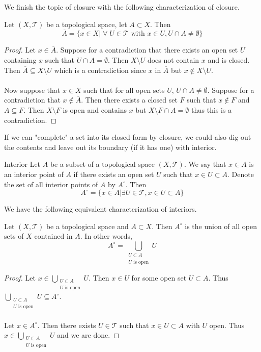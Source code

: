 \documentclass[a4paper]{article}
\begin{document}
We finish the topic of closure with the following characterization of closure. 

\begin{thm}{}{} Let $(X,\mathcal{T})$ be a topological space, let $A\subset X$. Then $$\overline{A}=\{x\in X|\;\forall\;U\in\mathcal{T}\text{ with }x\in U,U\cap A\neq\emptyset\}$$ \tcbline
\begin{proof}
Let $x\in\overline{A}$. Suppose for a contradiction that there exists an open set $U$ containing $x$ such that $U\cap A=\emptyset$. Then $X\setminus U$ does not contain $x$ and is closed. Then $\overline{A}\subseteq X\setminus U$ which is a contradiction since $x$ in $\overline{A}$ but $x\notin X\setminus U$. \\~\\
Now suppose that $x\in X$ such that for all open sets $U$, $U\cap A\neq\emptyset$. Suppose for a contradiction that $x\notin\overline{A}$. Then there exists a closed set $F$ such that $x\notin F$ and $A\subseteq F$. Then $X\setminus F$ is open and contains $x$ but $X\setminus F\cap A=\emptyset$ thus this is a contradiction. 
\end{proof}
\end{thm}

If we can "complete" a set into its closed form by closure, we could also dig out the contents and leave out its boundary (if it has one) with interior. 

\begin{defn}{Interior}{} Let $A$ be a subset of a topological space $(X,\mathcal{T})$. We say that $x\in A$ is an interior point of $A$ if there exists an open set $U$ such that $x\in U\subset A$. Denote the set of all interior points of $A$ by $A^\circ$. Then $$A^\circ=\{x\in A|\exists U\in\mathcal{T},x\in U\subset A\}$$
\end{defn}

We have the following equivalent characterization of interiors. 

\begin{prp}{}{} Let $(X,\mathcal{T})$ be a topological space and $A\subset X$. Then $A^\circ$ is the union of all open sets of $X$ contained in $A$. In other words, $$A^\circ=\bigcup_{\substack{U\subset A\\U\text{ is open}}}U$$\tcbline
\begin{proof}
Let $x\in\bigcup_{\substack{U\subset A\\U\text{ is open}}}U$. Then $x\in U$ for some open set $U\subset A$. Thus $\bigcup_{\substack{U\subset A\\U\text{ is open}}}U\subseteq A^\circ$. \\~\\
Let $x\in A^\circ$. Then there exists $U\in\mathcal{T}$ such that $x\in U\subset A$ with $U$ open. Thus $x\in\bigcup_{\substack{U\subset A\\U\text{ is open}}}U$ and we are done. 
\end{proof}
\end{prp}
\end{document}

